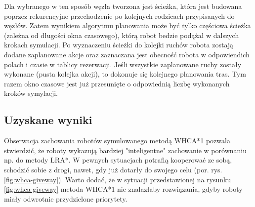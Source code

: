 Dla wybranego w ten sposób węzła tworzona jest ścieżka, która jest budowana poprzez rekurencyjne przechodzenie po kolejnych rodzicach przypisanych do węzłów.
Zatem wynikiem algorytmu planowania może być tylko częściowa ścieżka (zależna od długości okna czasowego), którą robot bedzie podążał w dalszych krokach symulacji.
Po wyznaczeniu ścieżki do kolejki ruchów robota zostają dodane zaplanowane akcje oraz zaznaczana jest obecność robota w odpowiendich polach i czasie w tablicy rezerwacji.
Jeśli wszystkie zaplanowane ruchy zostały wykonane (pusta kolejka akcji), to dokonuje się kolejnego planowania tras.
Tym razem okno czasowe jest już przesunięte o odpowiednią liczbę wykonanych kroków symylacji.

\subsection{Uzyskane wyniki}
Obserwacja zachowania robotów symulowanego metodą WHCA*1 pozwala stwierdzić, że roboty wykazują bardziej "inteligentne" zachowanie w porównaniu np. do metody LRA*.
W pewnych sytuacjach potrafią kooperować ze sobą, schodzić sobie z drogi, nawet, gdy już dotarły do swojego celu (por. rys. \ref{fig:whca-giveway}).
Warto dodać, że w sytuacji przedstawionej na rysunku \ref{fig:whca-giveway} metoda WHCA*1 nie znalazłaby rozwiązania, gdyby roboty miały odwrotnie przydzielone priorytety.
